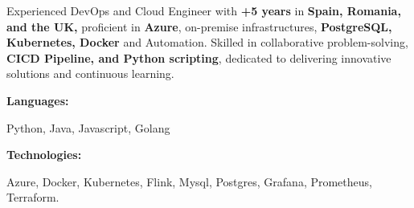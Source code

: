 \documentclass[9pt]{developercv} %
\begin{document}
\begin{minipage}[t]{0.46\textwidth}
    \vspace{-6pt}

    {Experienced DevOps and Cloud Engineer with \textbf{+5 years} in \textbf{Spain,
            Romania, and the UK,} proficient in \textbf{Azure}, on-premise
        infrastructures, \textbf{PostgreSQL, Kubernetes, Docker} and Automation.
        Skilled in collaborative problem-solving, \textbf{CICD
            Pipeline, and Python scripting}, dedicated to delivering
        innovative solutions and continuous learning.}
\end{minipage}
\hfill %
\begin{minipage}[t]{0.465\textwidth}
    \vspace{-6pt}

    \begin{minipage}[t]{0.2\textwidth}
        \textbf{Languages:}
    \end{minipage}
    \hfill
    \begin{minipage}[t]{0.72\textwidth}
        Python, Java, Javascript, Golang
    \end{minipage}
    \vspace{4mm}

    \begin{minipage}[t]{0.2\textwidth}
        \textbf{Technologies:}
    \end{minipage}
    \hfill
    \begin{minipage}[t]{0.73\textwidth}
        Azure, Docker, Kubernetes, Flink, Mysql, Postgres, Grafana, Prometheus, Terraform.
    \end{minipage}

\end{minipage}
\end{document}
